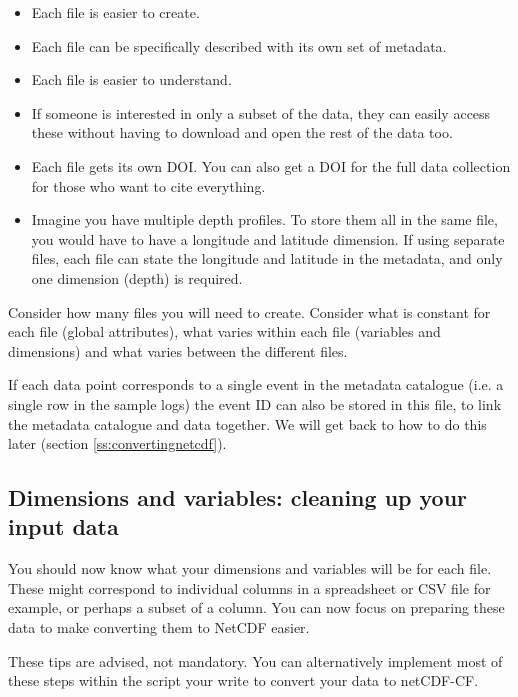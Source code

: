 \documentclass[a4paper,english, 11pt]{article}
\begin{document}
\begin{itemize}
\item Each file is easier to create.
\item Each file can be specifically described with its own set of metadata.
\item Each file is easier to understand.
\item If someone is interested in only a subset of the data, they can easily access these without having to download and open the rest of the data too.
\item Each file gets its own DOI. You can also get a DOI for the full data collection for those who want to cite everything.
\item Imagine you have multiple depth profiles. To store them all in the same file, you would have to have a longitude and latitude dimension. If using separate files, each file can state the longitude and latitude in the metadata, and only one dimension (depth) is required.
\end{itemize}   

Consider how many files you will need to create. Consider what is constant for each file (global attributes), what varies within each file (variables and dimensions) and what varies between the different files.

If each data point corresponds to a single event in the metadata catalogue (i.e. a single row in the sample logs) the event ID can also be stored in this file, to link the metadata catalogue and data together. We will get back to how to do this later (section \ref{ss:convertingnetcdf}).

\subsection{Dimensions and variables: cleaning up your input data}
\label{ss:dimensionsvariables}

You should now know what your dimensions and variables will be for each file. These might correspond to individual columns in a spreadsheet or CSV file for example, or perhaps a subset of a column. You can now focus on preparing these data to make converting them to NetCDF easier.

These tips are advised, not mandatory. You can alternatively implement most of these steps within the script your write to convert your data to netCDF-CF. 
\end{document}

